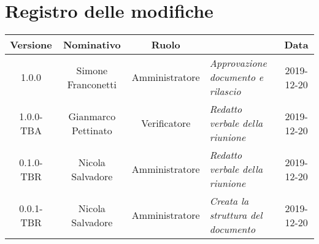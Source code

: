 \section*{Registro delle modifiche}
\renewcommand{\arraystretch}{1.8}

  \begin{longtable}{|c|c|c|p{3.8cm}|c|}
    \hline

    \rowcolor{header}
    \textbf{Versione} & \textbf{Nominativo} & \textbf{Ruolo} & \centering{\textbf{Descrizione}} & \textbf{Data}\\

    \hline
    1.0.0 & Simone Franconetti & Amministratore & \small{\textit{Approvazione documento e rilascio}} & 2019-12-20\\
	1.0.0-TBA & Gianmarco Pettinato & Verificatore & \small{\textit{Redatto verbale della riunione}} & 2019-12-20\\
    0.1.0-TBR & Nicola Salvadore & Amministratore & \small{\textit{Redatto verbale della riunione}} & 2019-12-20\\
    0.0.1-TBR & Nicola Salvadore & Amministratore & \small{\textit{Creata la struttura del documento}} & 2019-12-20\\

    \hline
  \end{longtable}
